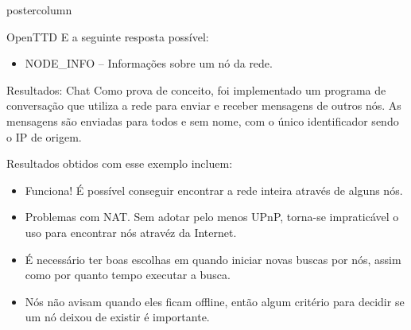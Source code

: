 \documentclass[final]{beamer}
\begin{document}
\begin{frame}
\begin{columns}
\begin{column}{.5\textwidth}
\begin{beamercolorbox}[center,wd=\textwidth]{postercolumn}
\begin{minipage}[T]{.95\textwidth}
{\begin{block}{OpenTTD}
                E a seguinte resposta possível:
                \begin{itemize}
                  \item NODE\_INFO -- Informações sobre um nó da rede.
                \end{itemize}
                
                \vspace*{0.2cm} 
            \end{block}

            \vspace*{0.2cm} 
            
            \begin{block}{Resultados: Chat}
              \justifying 
                Como prova de conceito, foi implementado um programa de conversação que utiliza a rede para enviar e receber
                mensagens de outros nós. As mensagens são enviadas para todos e sem nome, com o único identificador sendo o IP
                de origem.
                
                
                \vspace*{0.4cm}
                
                Resultados obtidos com esse exemplo incluem:
                \begin{itemize}
                  \item Funciona! É possível conseguir encontrar a rede inteira através de alguns nós.
                  \item Problemas com NAT. Sem adotar pelo menos UPnP, torna-se impraticável o uso para encontrar nós atravéz da Internet.
                  \item É necessário ter boas escolhas em quando iniciar novas buscas por nós, assim como por quanto tempo executar a busca.
                  \item Nós não avisam quando eles ficam offline, então algum critério para decidir se um nó deixou de existir é importante.
                \end{itemize}
                

\end{block}}
\end{minipage}
\end{beamercolorbox}
\end{column}
\end{columns}
\end{frame}
\end{document}

